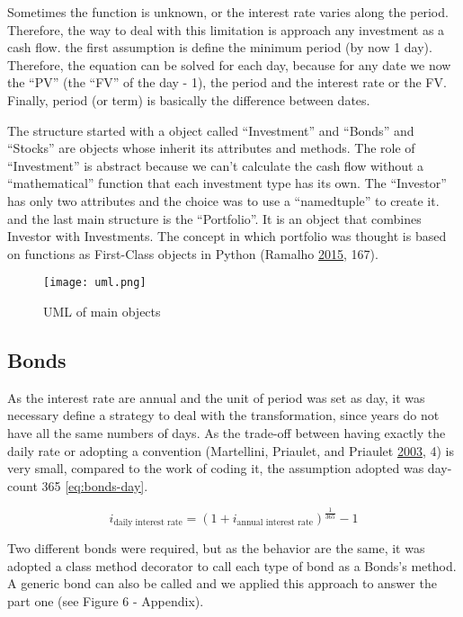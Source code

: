 \documentclass[
  11pt,
]{article}
\begin{document}
Sometimes the function is unknown, or the interest rate varies along the period. Therefore, the way to deal with this limitation is approach any investment as a cash flow. the first assumption is define the minimum period (by now 1 day). Therefore, the equation can be solved for each day, because for any date we now the ``PV'' (the ``FV'' of the day - 1), the period and the interest rate or the FV. Finally, period (or term) is basically the difference between dates.

The structure started with a object called ``Investment'' and ``Bonds'' and ``Stocks'' are objects whose inherit its attributes and methods. The role of ``Investment'' is abstract because we can't calculate the cash flow without a ``mathematical'' function that each investment type has its own. The ``Investor'' has only two attributes and the choice was to use a ``namedtuple'' to create it. and the last main structure is the ``Portfolio''. It is an object that combines Investor with Investments. The concept in which portfolio was thought is based on functions as First-Class objects in Python (Ramalho \protect\hyperlink{ref-fpy}{2015}, 167).

\begin{figure}
\centering
\texttt{[image: uml.png]}
\caption{UML of main objects}
\end{figure}

\hypertarget{bonds}{%
\subsection{Bonds}\label{bonds}}

As the interest rate are annual and the unit of period was set as day, it was necessary define a strategy to deal with the transformation, since years do not have all the same numbers of days. As the trade-off between having exactly the daily rate or adopting a convention (Martellini, Priaulet, and Priaulet \protect\hyperlink{ref-secur}{2003}, 4) is very small, compared to the work of coding it, the assumption adopted was day-count 365 \eqref{eq:bonds-day}.

\begin{equation}
i_{\text{daily interest rate}}=(1+i_{\text{annual interest rate}})^{\frac{1}{365}}-1
\label{eq:bonds-day}
\end{equation}

Two different bonds were required, but as the behavior are the same, it was adopted a class method decorator to call each type of bond as a Bonds's method. A generic bond can also be called and we applied this approach to answer the part one (see Figure 6 - Appendix).
\end{document}
